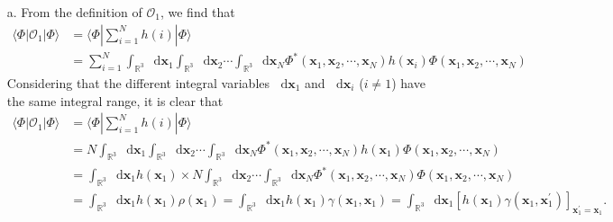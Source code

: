 \documentclass[a4paper]{book}
\newcommand*{\dif}{\mathop{}\!\mathrm{d}}
\begin{document}
	\begin{solution}
	
	\begin{itemize}
	
	\item[a.] From the definition of $\mathscr{O}_1$, we find that	
	\begin{align*}
		\langle \Phi | \mathscr{O}_1 | \Phi \rangle &= \langle \Phi | \sum_{ i=1 }^N h(i) | \Phi \rangle \\
		&= \sum_{ i=1 }^N \int_{ \mathbb{R}^3 } \dif \boldsymbol{x}_1 \int_{ \mathbb{R}^3 } \dif \boldsymbol{x}_2 \cdots \int_{ \mathbb{R}^3 } \dif \boldsymbol{x}_N \Phi^*( \boldsymbol{x}_1, \boldsymbol{x}_2, \cdots , \boldsymbol{x}_N ) h( \boldsymbol{x}_i ) \Phi( \boldsymbol{x}_1, \boldsymbol{x}_2, \cdots , \boldsymbol{x}_N )
	\end{align*}
	Considering that the different integral variables $\dif \boldsymbol{x}_1$ and $\dif \boldsymbol{x}_i$ ($i \neq 1$) have the same integral range, it is clear that	
	\begin{align*}
		\langle \Phi | \mathscr{O}_1 | \Phi \rangle &= \langle \Phi | \sum_{ i=1 }^N h(i) | \Phi \rangle \\
		&= N \int_{ \mathbb{R}^3 } \dif \boldsymbol{x}_1 \int_{ \mathbb{R}^3 } \dif \boldsymbol{x}_2 \cdots \int_{ \mathbb{R}^3 } \dif \boldsymbol{x}_N \Phi^*( \boldsymbol{x}_1, \boldsymbol{x}_2, \cdots , \boldsymbol{x}_N ) h( \boldsymbol{x}_1 ) \Phi( \boldsymbol{x}_1, \boldsymbol{x}_2, \cdots , \boldsymbol{x}_N ) \\
		&= \int_{ \mathbb{R}^3 } \dif \boldsymbol{x}_1 h( \boldsymbol{x}_1 ) \times N \int_{ \mathbb{R}^3 } \dif \boldsymbol{x}_2 \cdots \int_{ \mathbb{R}^3 } \dif \boldsymbol{x}_N \Phi^*( \boldsymbol{x}_1, \boldsymbol{x}_2, \cdots , \boldsymbol{x}_N ) \Phi( \boldsymbol{x}_1, \boldsymbol{x}_2, \cdots , \boldsymbol{x}_N ) \\
		&= \int_{ \mathbb{R}^3 } \dif \boldsymbol{x}_1 h( \boldsymbol{x}_1 ) \rho( \boldsymbol{x}_1 ) = \int_{ \mathbb{R}^3 } \dif \boldsymbol{x}_1 h( \boldsymbol{x}_1 ) \gamma( \boldsymbol{x}_1 , \boldsymbol{x}_1 ) = \int_{ \mathbb{R}^3 } \dif \boldsymbol{x}_1 \left[ h( \boldsymbol{x}_1 ) \gamma( \boldsymbol{x}_1 , \boldsymbol{x}^\prime_1 ) \right]_{ \boldsymbol{x}^\prime_1 = \boldsymbol{x}_1 }.
	\end{align*}
		

\end{itemize}
\end{solution}
\end{document}
